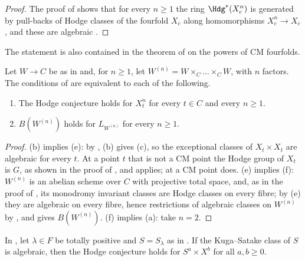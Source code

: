 \begin{proof}
The proof of  shows that for every $n\ge1$ the ring
$\Hdg^{*}(X_{c}^{n})$ is generated by pull-backs of Hodge classes of the
fourfold $X_{c}$ along homomorphisms $X_{c}^{n}\to X_{c}$, and these are
algebraic \cite{Mar25a}.
\end{proof}

The statement is also contained in the theorem of \cite{Li26} on the
powers of CM fourfolds.

\begin{corollary}
\label{cor:mumfordpowersequiv}
Let $W\to C$ be as in  and, for $n\ge1$, let
$W^{(n)}=W\times_{C}\dots\times_{C}W$, with $n$ factors. The conditions of
 are equivalent to each of the following.
\begin{enumerate}[label=\textup{(\alph*)},start=5,leftmargin=2.6em,itemsep=2pt]
\item The Hodge conjecture holds for $X_{t}^{n}$ for every $t\in C$ and
  every $n\ge1$.
\item $B(W^{(n)})$ holds for $L_{W^{(n)}}$ for every $n\ge1$.
\end{enumerate}
\end{corollary}

\begin{proof}
(b) implies (e): by , (b) gives (c), so the
exceptional classes of $X_{t}\times X_{t}$ are algebraic for every $t$. At a
point $t$ that is not a CM point the Hodge group of $X_{t}$ is $G$, as shown
in the proof of , and 
applies; at a CM point  does. (e) implies (f):
$W^{(n)}$ is an abelian scheme over $C$ with projective total space, and, as
in the proof of , its monodromy invariant classes are
Hodge classes on every fibre; by (e) they are algebraic on every fibre, hence
restrictions of algebraic classes on $W^{(n)}$ by , and
 gives $B(W^{(n)})$. (f) implies (a): take $n=2$.
\end{proof}

\begin{corollary}\label{cor:mumfordksproducts}
In , let $\lambda\in F$ be totally positive and
$S=S_{\lambda}$ as in . If the Kuga--Satake class of $S$
is algebraic, then the Hodge conjecture holds for $S^{a}\times X^{b}$ for all
$a,b\ge0$.
\end{corollary}

